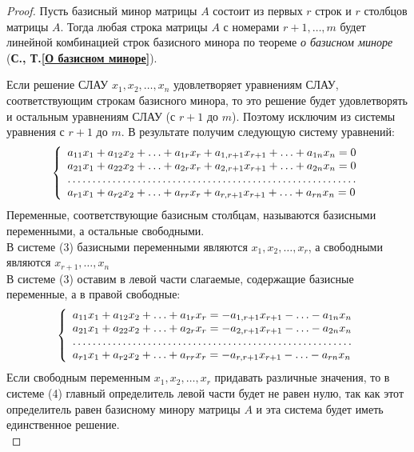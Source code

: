\begin{proof}
\hspace{0.6cm}Пусть базисный минор матрицы $A$ состоит из первых $r$ строк и $r$ столбцов матрицы $A$. Тогда любая строка матрицы $A$ с номерами $r+1,\ldots,m$ будет линейной комбинацией строк базисного минора по теореме \textit{о базисном миноре} (\textbf{С.\pageref{О базисном миноре}, Т.\ref{О базисном миноре}}). \par
Если решение СЛАУ $x_1, x_2,\ldots, x_n$ удовлетворяет уравнениям СЛАУ, соответствующим строкам базисного минора, то это решение будет удовлетворять и остальным уравнениям СЛАУ (с $r+1$ до $m$). Поэтому исключим из системы уравнения с $r+1$ до $m$. В результате получим следующую систему уравнений:
\begin{gather}
\left\{ \begin{array}{l}
a_{11}x_1 + a_{12}x_2 + \ldots + a_{1r}x_r + a_{1, r+1}x_{r+1} + \ldots + a_{1n}x_n = 0\\
a_{21}x_1 + a_{22}x_2 + \ldots + a_{2r}x_r + a_{2, r+1}x_{r+1} + \ldots + a_{2n}x_n = 0\\
\hdotsfor{1}\\
a_{r1}x_1 + a_{r2}x_2 + \ldots + a_{rr}x_r + a_{r, r+1}x_{r+1} + \ldots + a_{rn}x_n = 0
\end{array} \right.
\end{gather}
\hspace{0.6cm}Переменные, соответствующие базисным столбцам, называются базисными переменными, а остальные свободными.\\
В системе (3) базисными переменными являются $x_1, x_2, \ldots, x_r$, а свободными являются $x_{r+1},\ldots, x_n$\\
В системе (3) оставим в левой части слагаемые, содержащие базисные переменные, а в правой свободные:
\begin{gather}
\left\{ \begin{array}{l}
a_{11}x_1 + a_{12}x_2 + \ldots + a_{1r}x_r = - a_{1, r+1}x_{r+1} - \ldots - a_{1n}x_n\\
a_{21}x_1 + a_{22}x_2 + \ldots + a_{2r}x_r = - a_{2, r+1}x_{r+1} - \ldots - a_{2n}x_n\\
\hdotsfor{1}\\
a_{r1}x_1 + a_{r2}x_2 + \ldots + a_{rr}x_r = - a_{r, r+1}x_{r+1} - \ldots - a_{rn}x_n
\end{array} \right.
\end{gather}
\hspace{0.6cm}Если свободным переменным $x_1, x_2, \ldots, x_r$ придавать различные значения, то в системе (4) главный определитель левой части будет не равен нулю, так как этот определитель равен базисному минору матрицы $A$ и эта система будет иметь единственное решение.\\

\end{proof}
